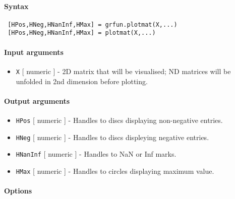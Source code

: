 


	\paragraph{Syntax}
 
 \begin{verbatim}
 [HPos,HNeg,HNanInf,HMax] = grfun.plotmat(X,...)
 [HPos,HNeg,HNanInf,HMax] = plotmat(X,...)
 \end{verbatim}
 
 \paragraph{Input arguments}
 
 \begin{itemize}
 \item
   \texttt{X} {[} numeric {]} - 2D matrix that will be visualised; ND
   matrices will be unfolded in 2nd dimension before plotting.
 \end{itemize}
 
 \paragraph{Output arguments}
 
 \begin{itemize}
 \item
   \texttt{HPos} {[} numeric {]} - Handles to discs displaying
   non-negative entries.
 \item
   \texttt{HNeg} {[} numeric {]} - Handles to discs displeying negative
   entries.
 \item
   \texttt{HNanInf} {[} numeric {]} - Handles to NaN or Inf marks.
 \item
   \texttt{HMax} {[} numeric {]} - Handles to circles displaying maximum
   value.
 \end{itemize}
 
 \paragraph{Options}
 
